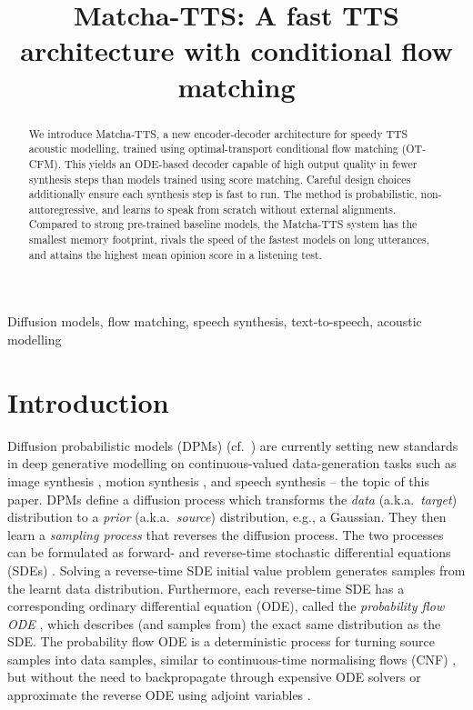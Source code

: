\documentclass[british]{article}
\title{Matcha-TTS: A fast TTS architecture with conditional flow matching}
\begin{document}
\maketitle
\begin{abstract}
We introduce Matcha-TTS, a new encoder-decoder architecture for speedy TTS acoustic modelling, trained using optimal-transport conditional flow matching (OT-CFM). This yields an ODE-based decoder capable of high output quality in fewer synthesis steps than models trained using score matching. Careful design choices additionally ensure each synthesis step is fast to run. The method is probabilistic, non-autoregressive, and learns to speak from scratch without external alignments. Compared to strong pre-trained baseline models, the Matcha-TTS system has the smallest memory footprint, rivals the speed of the fastest models on long utterances, and attains the highest mean opinion score in a listening test.
\end{abstract}
\begin{keywords}Diffusion models, flow matching, speech synthesis, text-to-speech, acoustic modelling
\end{keywords}
\section{Introduction}
\label{sec:intro}


Diffusion probabilistic models (DPMs) (cf.\ \cite{song2019generative}) are currently setting new standards in deep generative modelling on continuous-valued data-generation tasks such as image synthesis \cite{dhariwal2021diffusion,rombach2022high}, motion synthesis \cite{alexanderson2023listen,mehta2023diff}, and speech synthesis \cite{chen2021wavegrad, chen2021wavegrad2, popov2021grad, jeong2021diff, kongdiffwave} -- the topic of this paper.
DPMs define a diffusion process which transforms the \emph{data} (a.k.a.\ \emph{target}) distribution to a \emph{prior} (a.k.a.\ \emph{source}) distribution, e.g., a Gaussian.
They then learn a \emph{sampling process} that reverses the diffusion process.
The two processes can be formulated as forward- and reverse-time stochastic differential equations (SDEs) \cite{song2021score}.
Solving a reverse-time SDE initial value problem  generates samples from the learnt data distribution.
Furthermore, each reverse-time SDE has a corresponding ordinary differential equation (ODE), called the \emph{probability flow ODE} \cite{song2021score,albergo2022building}, which describes (and samples from) the exact same distribution as the SDE.
The probability flow ODE is a deterministic process for turning source samples into data samples,
similar to continuous-time normalising flows (CNF) \cite{chen2018neural}, but without the need to backpropagate through expensive ODE solvers or approximate the reverse ODE using adjoint variables \cite{chen2018neural}.
\end{document}
